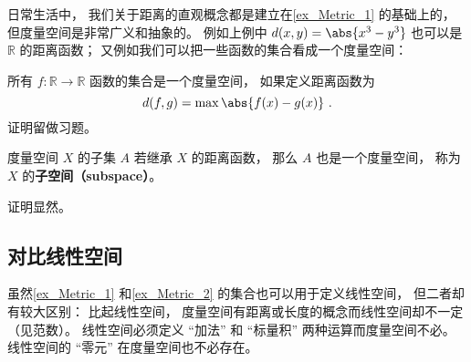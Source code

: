 日常生活中， 我们关于距离的直观概念都是建立在\autoref{ex_Metric_1} 的基础上的， 但度量空间是非常广义和抽象的。 例如上例中 $d(x, y) = \abs{x^3 - y^3}$ 也可以是 $\mathbb R$ 的距离函数； 又例如我们可以把一些函数的集合看成一个度量空间：
\begin{example}{}\label{ex_Metric_2}
所有 $f:\mathbb R \to \mathbb R$ 函数的集合是一个度量空间， 如果定义距离函数为
\begin{equation}
d(f, g) = \max{\abs{f(x) - g(x)}}~.
\end{equation}
证明留做习题。
\end{example}



\begin{corollary}{}
度量空间 $X$ 的子集 $A$ 若继承 $X$ 的距离函数， 那么 $A$ 也是一个度量空间， 称为 $X$ 的\textbf{子空间（subspace）}。
\end{corollary}
证明显然。

\subsection{对比线性空间}
虽然\autoref{ex_Metric_1} 和\autoref{ex_Metric_2} 的集合也可以用于定义线性空间， 但二者却有较大区别： 比起线性空间， 度量空间有距离或长度的概念而线性空间却不一定（见范数）。 线性空间必须定义 “加法” 和 “标量积” 两种运算而度量空间不必。 线性空间的 “零元” 在度量空间也不必存在。
